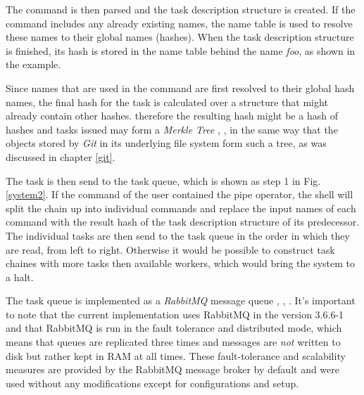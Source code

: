 The command is then parsed and the task description structure
is created. If the command includes any already existing names,
the name table is used to resolve these names to their global
names (hashes). When the task description structure is finished, its
hash is stored in the name table behind the name \textit{foo},
as shown in the example.

Since names that are used in the command are first resolved to
their global hash names, the final hash for the
task is calculated over a structure that might already contain
other hashes. therefore the resulting hash might be a hash of hashes
and tasks issued may form a \textit{Merkle Tree} \cite{merkletree},
\cite{merkletreewiki}, in the same way that the objects stored
by \textit{Git} in its underlying file system form such a tree,
as was discussed in chapter \ref{git}.
\newline

The task is then send to the task queue, which is shown as step
1 in Fig.\ref{system2}. If the command of the user contained the
pipe operator, the shell will split the chain up into individual
commands and replace the input names of each command with the
result hash of the task description structure of its
predecessor. The individual tasks are then send to the task
queue in the order in which they are read, from left to right.
Otherwise it would be possible to construct task chaines with
more tasks then available workers, which would bring the system
to a halt.

The task queue is implemented
as a \textit{RabbitMQ} message queue \cite{rabbitmq},
\cite{rabbitmqwiki}, \cite{rabbitmqbook}. It's important to
note that the current implementation uses RabbitMQ in the
version 3.6.6-1 and that RabbitMQ is run in the fault tolerance
and distributed mode, which means that queues are replicated three
times and messages are \textit{not} written to disk but rather kept in
RAM at all times. These fault-tolerance and scalability measures
are provided by the RabbitMQ message broker by default and were
used without any modifications except for configurations and
setup.
\newline

